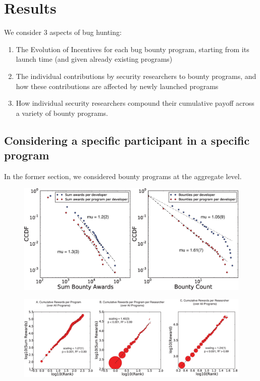 \section{Results}
\label{sec:results}
We consider 3 aspects of bug hunting:

\begin{enumerate}
  \item The Evolution of Incentives for each bug bounty program, starting from its launch time (and given already existing programs)
  \item The individual contributions by security researchers to bounty programs, and how these contributions are affected by newly launched programs
  \item How individual security researchers compound their cumulative payoff across a variety of bounty programs.
\end{enumerate}

\subsection{Considering a specific participant in a specific program}
In the former section, we considered bounty programs at the aggregate level.




\begin{figure}
\begin{center}
\includegraphics[width=12cm]{figures/CCDF_count_Bounties.eps}
\caption{}
\label{ }
\end{center}
\end{figure}


\begin{figure}
\begin{center}
\includegraphics[width=16cm]{figures/scalings.eps}
\caption{}
\label{ }
\end{center}
\end{figure}
